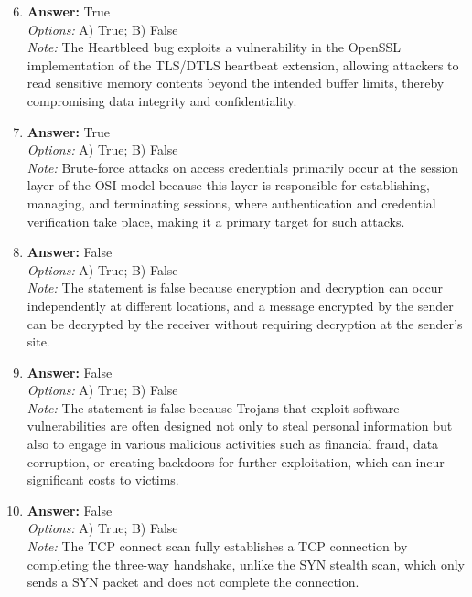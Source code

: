 \documentclass[12pt]{article}
\begin{document}
\begin{enumerate}[label=\arabic*.]
\setcounter{enumi}{5}
\item \textbf{Answer:} True
\\ \textit{Options:} A) True; B) False
\\ \textit{Note:} The Heartbleed bug exploits a vulnerability in the OpenSSL implementation of the TLS/DTLS heartbeat extension, allowing attackers to read sensitive memory contents beyond the intended buffer limits, thereby compromising data integrity and confidentiality.
\item \textbf{Answer:} True
\\ \textit{Options:} A) True; B) False
\\ \textit{Note:} Brute-force attacks on access credentials primarily occur at the session layer of the OSI model because this layer is responsible for establishing, managing, and terminating sessions, where authentication and credential verification take place, making it a primary target for such attacks.
\item \textbf{Answer:} False
\\ \textit{Options:} A) True; B) False
\\ \textit{Note:} The statement is false because encryption and decryption can occur independently at different locations, and a message encrypted by the sender can be decrypted by the receiver without requiring decryption at the sender's site.
\item \textbf{Answer:} False
\\ \textit{Options:} A) True; B) False
\\ \textit{Note:} The statement is false because Trojans that exploit software vulnerabilities are often designed not only to steal personal information but also to engage in various malicious activities such as financial fraud, data corruption, or creating backdoors for further exploitation, which can incur significant costs to victims.
\item \textbf{Answer:} False
\\ \textit{Options:} A) True; B) False
\\ \textit{Note:} The TCP connect scan fully establishes a TCP connection by completing the three-way handshake, unlike the SYN stealth scan, which only sends a SYN packet and does not complete the connection.
\end{enumerate}
\end{document}
